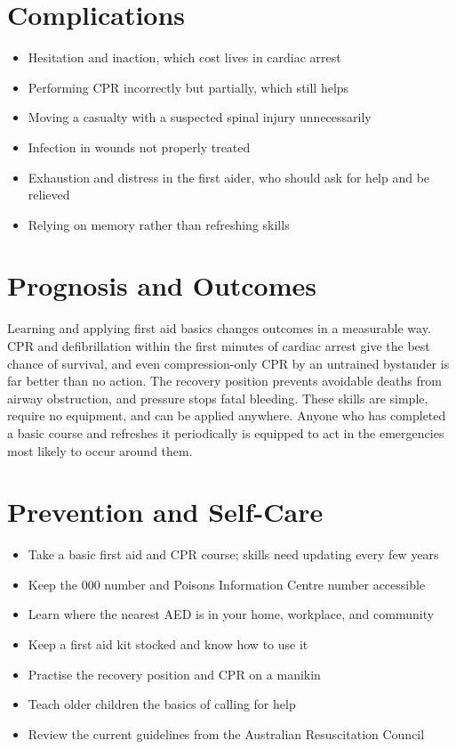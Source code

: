 \section*{Complications}
\begin{itemize}
    \item Hesitation and inaction, which cost lives in cardiac arrest
    \item Performing CPR incorrectly but partially, which still helps
    \item Moving a casualty with a suspected spinal injury unnecessarily
    \item Infection in wounds not properly treated
    \item Exhaustion and distress in the first aider, who should ask for help and be relieved
    \item Relying on memory rather than refreshing skills
\end{itemize}

\section*{Prognosis and Outcomes}
Learning and applying first aid basics changes outcomes in a measurable way. CPR and defibrillation within the first minutes of cardiac arrest give the best chance of survival, and even compression-only CPR by an untrained bystander is far better than no action. The recovery position prevents avoidable deaths from airway obstruction, and pressure stops fatal bleeding. These skills are simple, require no equipment, and can be applied anywhere. Anyone who has completed a basic course and refreshes it periodically is equipped to act in the emergencies most likely to occur around them.

\section*{Prevention and Self-Care}
\begin{itemize}
    \item Take a basic first aid and CPR course; skills need updating every few years
    \item Keep the 000 number and Poisons Information Centre number accessible
    \item Learn where the nearest AED is in your home, workplace, and community
    \item Keep a first aid kit stocked and know how to use it
    \item Practise the recovery position and CPR on a manikin
    \item Teach older children the basics of calling for help
    \item Review the current guidelines from the Australian Resuscitation Council
\end{itemize}

